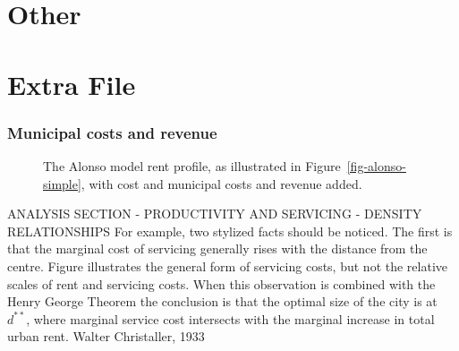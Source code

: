 \part{Other}











\part{Extra File}

\section{Municipal costs and revenue}

\begin{figure}
\begin{center}

\end{center}
\caption[The Alonso model with municipal costs and revenue.]{The Alonso model \gls{rent profile}, as illustrated in Figure~\ref{fig-alonso-simple}, with cost and municipal costs and revenue added.} %
\label{fig-municipal-costs}
\end{figure}
 

ANALYSIS SECTION - PRODUCTIVITY AND SERVICING - DENSITY RELATIONSHIPS For example, two stylized facts should be noticed. The first is that the marginal cost of servicing generally rises with the distance from the centre. Figure illustrates the general form of servicing costs, but not the relative scales of rent and servicing costs. When this observation is combined with the \gls{Henry George Theorem} the conclusion is that the optimal size of the city  is at  $d^{**}$, where marginal service cost intersects with the marginal increase in total urban rent.  Walter Christaller, 1933


